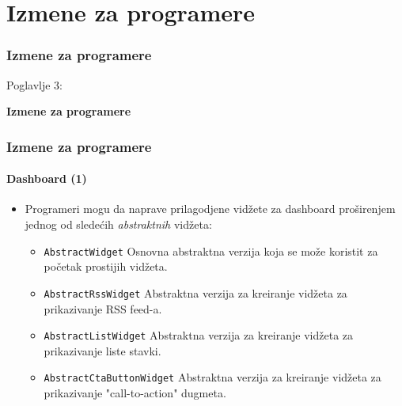 %

\section{Izmene za programere}
\begin{frame}[fragile]
	\frametitle{Izmene za programere}

	\begin{center}\huge{Poglavlje 3:}\end{center}
	\begin{center}\huge{\color{typo3darkgrey}\textbf{Izmene za programere}}\end{center}

\end{frame}


\begin{frame}[fragile]
	\frametitle{Izmene za programere}
	\framesubtitle{Dashboard (1)}

	\lstset{basicstyle=\smaller\ttfamily}

	\begin{itemize}
		\item Programeri mogu da naprave prilagodjene vidžete za dashboard proširenjem jednog od sledećih \textit{abstraktnih} vidžeta:

			\begin{itemize}
				\item \texttt{AbstractWidget}\newline
					\small
						Osnovna abstraktna verzija koja se može koristit za početak prostijih vidžeta.
					\normalsize
				\item \texttt{AbstractRssWidget}\newline
					\small
						Abstraktna verzija za kreiranje vidžeta za prikazivanje RSS feed-a.
					\normalsize
				\item \texttt{AbstractListWidget}\newline
					\small
						Abstraktna verzija za kreiranje vidžeta za prikazivanje liste stavki.
					\normalsize
				\item \texttt{AbstractCtaButtonWidget}\newline
					\small
						Abstraktna verzija za kreiranje vidžeta za prikazivanje "call-to-action" dugmeta.
					\normalsize
			\end{itemize}

	\end{itemize}

\end{frame}

